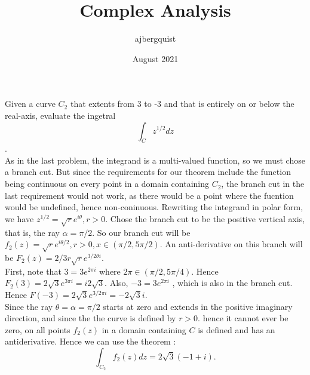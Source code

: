 \documentclass{article}
\title{Complex Analysis}
\author{ajbergquist }
\date{August 2021}
\theoremstyle{definition}
\newcommand{\cs}[1]{\color{blue}{#1}\normalcolor}
\begin{document}
 Given a curve $C_2$ that extents from 3 to -3 and that is entirely on or below the real-axis, evaluate the ingetral 
$$\int_Cz^{1/2}dz$$.\\
 As in the last problem, the integrand is a multi-valued function, so we must chose a branch cut. But since the requirements for our theorem include the function being continuous on every point in a domain containing $C_2$, the branch cut in the last requirement would not work, as there would be a point where the fucntion would be undefined, hence non-coninuous. Rewriting the integrand in polar form, we have $z^{1/2} = \sqrt{r}e^{i\theta}, r> 0$. Chose the branch cut to be the positive vertical axis, that is, the ray $\alpha = \pi/2$. So our branch cut will be  $f_2(z) = \sqrt{r}e^{i\theta/2}, r> 0,x\in(\pi/2,5\pi/2)$. An anti-derivative on this branch will be $F_2(z) = 2/3r\sqrt{r}e^{3/2\theta i}$.\\

First, note that $3 = 3e^{2\pi i}$ where $2\pi \in (\pi/2,5\pi/4)$. Hence $F_2(3) = 2\sqrt{3}e^{3\pi i} = i2\sqrt{3}$. Also, $-3 = 3e^{2\pi i}$ \cs{No 2 this time.}, which is also in the branch cut. Hence $F(-3) = 2\sqrt{3}e^{3/2\pi i} = -2\sqrt{3}i.$\\

Since the ray $\theta = \alpha = \pi/2$ starts at zero and extends in the positive imaginary direction, and since the the curve is defined by $r > 0$. hence it \cs{What is ``it''?} cannot ever be zero, on all points $f_2(z)$ in a domain containing $C$ is defined and has an antiderivative. Hence we can use the theorem \cs{Which theorem?}:
$$\int_{C_2}f_2(z)dz = 2\sqrt{3}(-1 + i).$$

\cs{And around the full circle?}

\cs{5/5}
\end{document}
